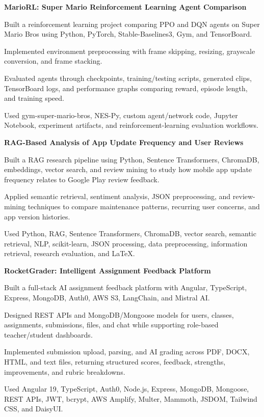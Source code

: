\documentclass[letterpaper,10pt]{article}
\newcommand{\projectHeading}[2]{
  \vspace{2pt}
  \textbf{#1} \hfill #2
}
\begin{document}
\projectHeading{MarioRL: Super Mario Reinforcement Learning Agent Comparison}{}
\begin{tightitemize}
  \item Built a reinforcement learning project comparing PPO and DQN agents on Super Mario Bros using Python, PyTorch, Stable-Baselines3, Gym, and TensorBoard.
  \item Implemented environment preprocessing with frame skipping, resizing, grayscale conversion, and frame stacking.
  \item Evaluated agents through checkpoints, training/testing scripts, generated clips, TensorBoard logs, and performance graphs comparing reward, episode length, and training speed.
  \item Used gym-super-mario-bros, NES-Py, custom agent/network code, Jupyter Notebook, experiment artifacts, and reinforcement-learning evaluation workflows.
\end{tightitemize}

\projectHeading{RAG-Based Analysis of App Update Frequency and User Reviews}{}
\begin{tightitemize}
  \item Built a RAG research pipeline using Python, Sentence Transformers, ChromaDB, embeddings, vector search, and review mining to study how mobile app update frequency relates to Google Play review feedback.
  \item Applied semantic retrieval, sentiment analysis, JSON preprocessing, and review-mining techniques to compare maintenance patterns, recurring user concerns, and app version histories.
  \item Used Python, RAG, Sentence Transformers, ChromaDB, vector search, semantic retrieval, NLP, scikit-learn, JSON processing, data preprocessing, information retrieval, research evaluation, and LaTeX.
\end{tightitemize}

\projectHeading{RocketGrader: Intelligent Assignment Feedback Platform}{}
\begin{tightitemize}
  \item Built a full-stack AI assignment feedback platform with Angular, TypeScript, Express, MongoDB, Auth0, AWS S3, LangChain, and Mistral AI.
  \item Designed REST APIs and MongoDB/Mongoose models for users, classes, assignments, submissions, files, and chat while supporting role-based teacher/student dashboards.
  \item Implemented submission upload, parsing, and AI grading across PDF, DOCX, HTML, and text files, returning structured scores, feedback, strengths, improvements, and rubric breakdowns.
  \item Used Angular 19, TypeScript, Auth0, Node.js, Express, MongoDB, Mongoose, REST APIs, JWT, bcrypt, AWS Amplify, Multer, Mammoth, JSDOM, Tailwind CSS, and DaisyUI.
\end{tightitemize}
\end{document}
